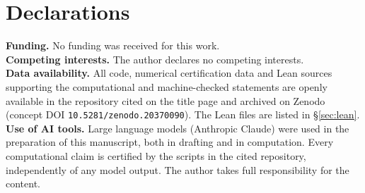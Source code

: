 \documentclass[11pt]{article}
\theoremstyle{plain}
\theoremstyle{definition}
\theoremstyle{remark}
\begin{document}
\section*{Declarations}
\noindent\textbf{Funding.} No funding was received for this work.
\smallskip\\
\noindent\textbf{Competing interests.} The author declares no competing interests.
\smallskip\\
\noindent\textbf{Data availability.} All code, numerical certification data and Lean sources
supporting the computational and machine-checked statements are openly available in the repository
cited on the title page and archived on Zenodo (concept DOI
\texttt{10.5281/zenodo.20370090}). The Lean files are listed in \S\ref{sec:lean}.
\smallskip\\
\noindent\textbf{Use of AI tools.} Large language models (Anthropic Claude) were used in the
preparation of this manuscript, both in drafting and in computation. Every computational claim
is certified by the scripts in the cited repository, independently of any model output. The
author takes full responsibility for the content.
\end{document}
